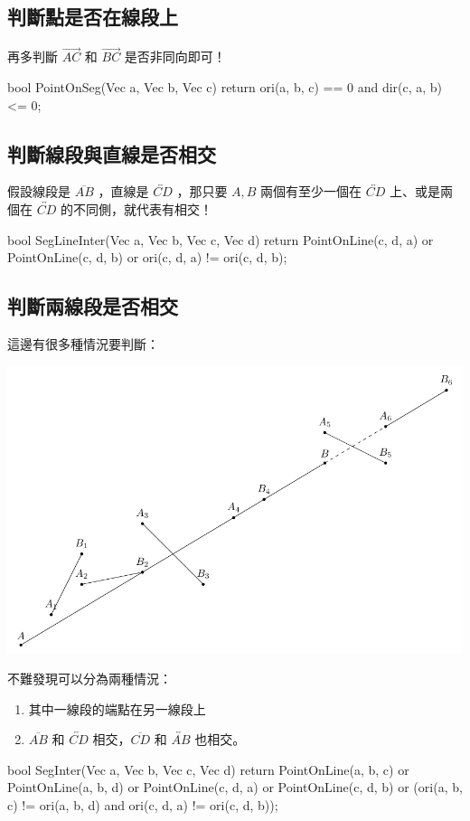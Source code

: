 \documentclass[main.tex]{subfiles}
\begin{document}
\subsection{判斷點是否在線段上}

再多判斷 $\vec{AC}$ 和 $\vec{BC}$ 是否非同向即可！

\begin{C++}
bool PointOnSeg(Vec a, Vec b, Vec c)
{ return ori(a, b, c) == 0 and dir(c, a, b) <= 0; }
\end{C++}

\subsection{判斷線段與直線是否相交}

假設線段是 $\overline{AB}$ ，直線是 $\overleftrightarrow{CD}$ ，那只要 $A, B$ 兩個有至少一個在 $\overleftrightarrow{CD}$ 上、或是兩個在 $\overleftrightarrow{CD}$ 的不同側，就代表有相交！

\begin{C++}
bool SegLineInter(Vec a, Vec b, Vec c, Vec d) {
	return PointOnLine(c, d, a) or PointOnLine(c, d, b)
		or ori(c, d, a) != ori(c, d, b);
}
\end{C++}

\subsection{判斷兩線段是否相交}

這邊有很多種情況要判斷：

\begin{center}
	\includegraphics*{images/Geometry/Basic/SegInter.pdf}
\end{center}

不難發現可以分為兩種情況：

\begin{enumerate}
	\item 其中一線段的端點在另一線段上
	\item $\overline{AB}$ 和 $\overleftrightarrow{CD}$ 相交，$\overline{CD}$ 和 $\overleftrightarrow{AB}$ 也相交。
\end{enumerate}

\begin{C++}
bool SegInter(Vec a, Vec b, Vec c, Vec d) {
	return PointOnLine(a, b, c) or PointOnLine(a, b, d)
		or PointOnLine(c, d, a) or PointOnLine(c, d, b)
		or (ori(a, b, c) != ori(a, b, d)
				and ori(c, d, a) != ori(c, d, b));
}
\end{C++}
\end{document}
